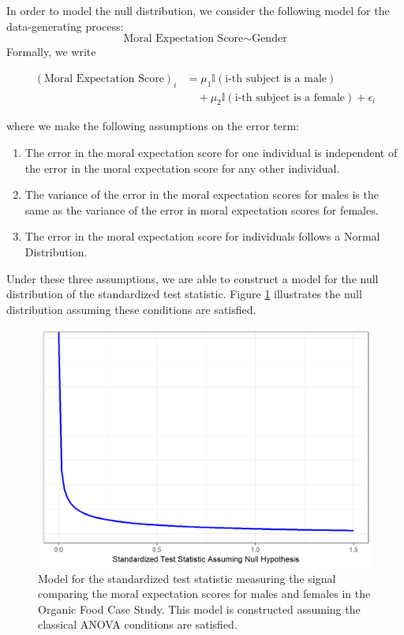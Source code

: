 \documentclass[]{book}
\providecommand{\tightlist}{%
  \setlength{\itemsep}{0pt}\setlength{\parskip}{0pt}}
\theoremstyle{definition}
\theoremstyle{definition}
\theoremstyle{definition}
\theoremstyle{remark}
\begin{document}
In order to model the null distribution, we consider the following model
for the data-generating process:
\[\text{Moral Expectation Score} \sim \text{Gender}\] Formally, we write

\begin{equation}
  \begin{split}
    (\text{Moral Expectation Score})_i & = \mu_1\mathbb{I}(\text{i-th subject is a male}) \\
      & \quad + \mu_2\mathbb{I}(\text{i-th subject is a female}) + \epsilon_i
  \end{split}
  \label{eq:anovarecap-model}
\end{equation}

where we make the following assumptions on the error term:

\begin{enumerate}
\def\labelenumi{\arabic{enumi}.}
\tightlist
\item
  The error in the moral expectation score for one individual is
  independent of the error in the moral expectation score for any other
  individual.
\item
  The variance of the error in the moral expectation scores for males is
  the same as the variance of the error in moral expectation scores for
  females.
\item
  The error in the moral expectation score for individuals follows a
  Normal Distribution.
\end{enumerate}

Under these three assumptions, we are able to construct a model for the
null distribution of the standardized test statistic. Figure
\ref{fig:anovarecap-classical-null-model} illustrates the null
distribution assuming these conditions are satisfied.

\begin{figure}

{\centering \includegraphics[width=0.8\linewidth]{./Images/anovarecap-classical-null-model-1} 

}

\caption{Model for the standardized test statistic measuring the signal comparing the moral expectation scores for males and females in the Organic Food Case Study.  This model is constructed assuming the classical ANOVA conditions are satisfied.}\label{fig:anovarecap-classical-null-model}
\end{figure}
\end{document}
